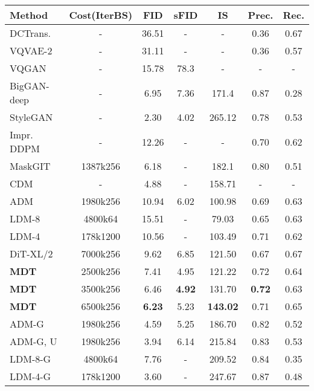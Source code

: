 \documentclass[final]{cvpr}
\begin{document}
\begin{table}
    \centering
    \setlength{\tabcolsep}{0.19mm} \small
    \begin{tabular}{lcccccc}
        \toprule
        Method	& Cost(IterBS) &  FID & sFID & IS & Prec. & Rec. \\	\midrule
        DCTrans.\cite{nash2021generating} & -  & 36.51 & - & - & 0.36 & 0.67 \\
        VQVAE-2\cite{razavi2019generating} & - & 31.11 & - &  - & 0.36 & 0.57 \\
        VQGAN\cite{esser2021taming} & - & 15.78 & 78.3 & - & - & - \\
        BigGAN-deep\cite{brock2018large} & -  & 6.95 &  7.36 &  171.4 &  0.87 &  0.28 \\
        StyleGAN\cite{sauer2022stylegan} & -   & 2.30 & 4.02  & 265.12 &  0.78 & 0.53 \\
        Impr. DDPM\cite{nichol2021improved} & - & 12.26 & - & - & 0.70 & 0.62 \\
        MaskGIT\cite{chang2022maskgit} & 1387k256 & 6.18 &  - & 182.1 & 0.80 & 0.51 \\
        CDM\cite{ho2022cascaded}  & - & 4.88  & - & 158.71 & - & - \\
        \midrule
        ADM\cite{dhariwal2021diffusion}  &1980k256& 10.94 & 6.02 & 100.98 & 0.69 & 0.63 \\
        LDM-8\cite{rombach2022high} & 4800k64 & 15.51 & - & 79.03 & 0.65 & 0.63 \\
        LDM-4 & 178k1200 & 10.56  & -  & 103.49 & 0.71  & 0.62 \\
        \hdashline
        DiT-XL/2\cite{peebles2022scalable} & 7000k256  & 9.62  & 6.85  & 121.50  & 0.67  & 0.67 \\
        \textbf{MDT} & 2500k256  & 7.41  & 4.95 & 121.22 & 0.72 & 0.64 \\
        \textbf{MDT} & 3500k256  & 6.46  & \textbf{4.92} & 131.70 & \textbf{0.72} & 0.63 \\
        \textbf{MDT} & 6500k256  & \textbf{6.23}  & 5.23 & \textbf{143.02} & 0.71 & 0.65 \\
        \midrule
        ADM-G\cite{dhariwal2021diffusion} &1980k256 & 4.59 & 5.25 & 186.70 & 0.82 & 0.52 \\
        ADM-G, U & 1980k256 & 3.94 & 6.14 & 215.84 & 0.83 & 0.53 \\
        LDM-8-G\cite{rombach2022high} & 4800k64 & 7.76 &  - & 209.52 & 0.84 & 0.35 \\
        LDM-4-G & 178k1200 & 3.60 & - & 247.67  & 0.87  & 0.48 \\  

\end{tabular}
\end{table}
\end{document}
